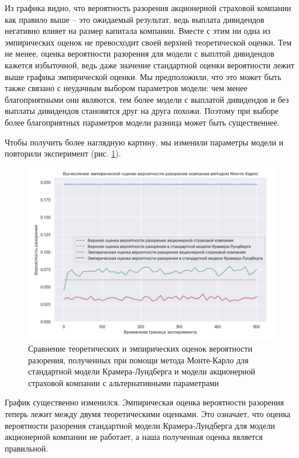 \documentclass{article}
\theoremstyle{plain}
\theoremstyle{plain}
\theoremstyle{plain}
\theoremstyle{plain}
\theoremstyle{definition}
\theoremstyle{remark}
\begin{document}
Из графика видно, что вероятность разорения акционерной страховой компании как правило выше -- это ожидаемый результат, ведь выплата дивидендов негативно влияет на размер капитала компании. Вместе с этим ни одна из эмпирических оценок не превосходит своей верхней теоретической оценки. Тем не менее, оценка вероятности разорения для модели с выплтой дивидендов кажется избыточной, ведь даже значение стандартной оценки вероятности лежит выше графика эмпирической оценки. Мы предположили, что это может быть также связано с неудачным выбором параметров модели: чем менее благоприятными они являются, тем более модели с выплатой дивидендов и без выплаты дивидендов становятся друг на друга похожи. Поэтому при выборе более благоприятных параметров модели разница может быть существеннее.

Чтобы получить более наглядную картину, мы изменили параметры модели и повторили эксперимент (рис. \ref{MC_2}).

\begin{figure}[h]
\centering
\includegraphics[scale=0.7]{images/KL_stock_MC_2.png}
\captionsetup{justification=centering}
\caption{Сравнение теоретических и эмпирических оценок вероятности разорения, полученных при помощи метода Монте-Карло для стандартной модели Крамера-Лундберга и модели акционерной страховой компании с альтернативными параметрами}
\label{MC_2}
\end{figure}

График существенно изменился. Эмпирическая оценка вероятности разорения теперь лежит между двумя теоретическими оценками. Это означает, что оценка вероятности разорения стандартной модели Крамера-Лундберга для модели акционерной компании не работает, а наша полученная оценка является правильной.
\end{document}
